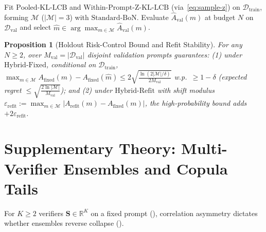 \documentclass{article}
\theoremstyle{plain}
\newtheorem{proposition}{Proposition}
\theoremstyle{definition}
\theoremstyle{remark}
\newcommand{\R}{\mathbb{R}}
\begin{document}
\begin{algorithm}[t]
\caption{Three-Branch Holdout Risk-Control Selector ($\mathrm{Hybrid\text{-}Fixed}$ vs.\ $\mathrm{Hybrid\text{-}Refit}$)}
\label{alg:hybrid-fixed}
\DontPrintSemicolon
{}
Fit $\mathrm{Pooled\text{-}KL\text{-}LCB}$ and $\mathrm{Within\text{-}Prompt\text{-}Z\text{-}KL\text{-}LCB}$ (via~\eqref{eq:sample-z}) on $\mathcal{D}_{\mathrm{train}}$, forming $\mathcal{M}$ ($|\mathcal{M}| = 3$) with $\mathrm{Standard\text{-}BoN}$.\;
Evaluate $\hat{A}_{\mathrm{val}}(m)$ at budget $N$ on $\mathcal{D}_{\mathrm{val}}$ and select $\hat{m} \in \arg\max_{m \in \mathcal{M}} \hat{A}_{\mathrm{val}}(m)$.\;
\end{algorithm}

\begin{proposition}[Holdout Risk-Control Bound and Refit Stability]
\label{prop:hybrid}
For any $N \ge 2$,  over $M_{\mathrm{val}} = |\mathcal{D}_{\mathrm{val}}|$ disjoint validation prompts guarantees: (1) under $\mathrm{Hybrid\text{-}Fixed}$, conditional on $\mathcal{D}_{\mathrm{train}}$, $\max_{m\in\mathcal{M}} A_{\mathrm{fixed}}(m) - A_{\mathrm{fixed}}(\hat{m}) \le 2\sqrt{\frac{\ln(2|\mathcal{M}|/\delta)}{2 M_{\mathrm{val}}}}$ w.p.\ $\ge 1 - \delta$ (expected regret $\le \sqrt{\frac{2\ln|\mathcal{M}|}{M_{\mathrm{val}}}}$); and (2) under $\mathrm{Hybrid\text{-}Refit}$ with shift modulus $\varepsilon_{\mathrm{refit}} := \max_{m\in\mathcal{M}}|A_{\mathrm{refit}}(m) - A_{\mathrm{fixed}}(m)|$, the high-probability bound adds $+2\varepsilon_{\mathrm{refit}}$.
\end{proposition}

\section{Supplementary Theory: Multi-Verifier Ensembles and Copula Tails}
\label{sec:ensemble}

For $K \ge 2$ verifiers $\mathbf{S} \in \R^K$ on a fixed prompt (), correlation asymmetry dictates whether ensembles reverse collapse \citep{coste2024reward,rame2024warm} ().
\end{document}
